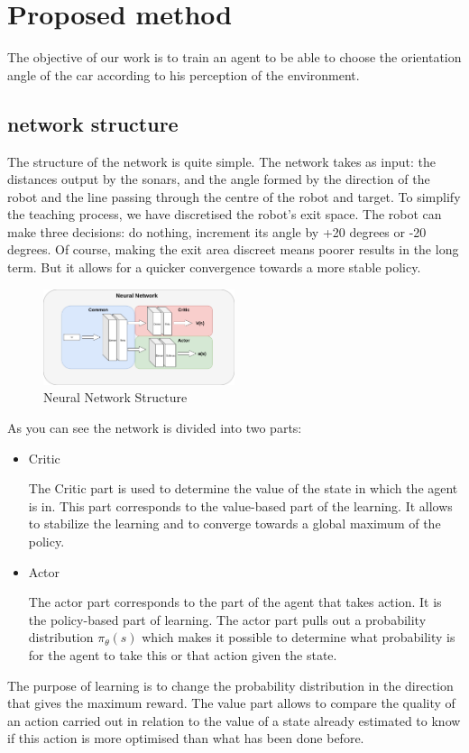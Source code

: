 \section{Proposed method}
The objective of our work is to train an agent to be able to choose the orientation angle of the car according to his perception of the environment. 

\subsection{network structure}

The structure of the network is quite simple. The network takes as input: 
the distances output by the sonars, and the angle formed by the direction of the robot and the line passing through the centre of the robot and target.
To simplify the teaching process, we have discretised the robot's exit space. The robot can make three decisions: do nothing, increment its angle by +20 degrees or -20 degrees.
Of course, making the exit area discreet means poorer results in the long term. But it allows for a quicker convergence towards a more stable policy.
    \begin{figure}[!htb]
        \centering
        \includegraphics[width=0.5\textwidth]{imgs/network.png}
        \caption{\label{fig:method} Neural Network Structure}
    \end{figure}

As you can see the network is divided into two parts:
\begin{itemize}
    \item Critic 
    
    
    The Critic part is used to determine the value of the state in which the agent is in. 
    This part corresponds to the value-based part of the learning. It allows to stabilize the learning and to converge towards a global maximum of the policy.
    \item Actor
    
    
    The actor part corresponds to the part of the agent that takes action. It is the policy-based part of learning. 
    The actor part pulls out a probability distribution $\pi_{\theta}(s)$ which makes it possible to determine what probability is for the agent to take this or that action given the state.
  \end{itemize}
  The purpose of learning is to change the probability distribution in the direction that gives the maximum reward. 
  The value part allows to compare the quality of an action carried out in relation to the value of a state already estimated to know if this action is more optimised than what has been done before.


